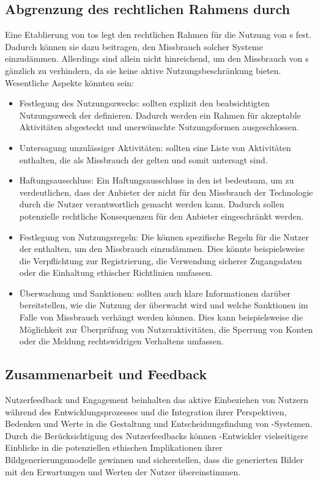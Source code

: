 \documentclass[hidelinks,12pt]{report}
\begin{document}
\subsection{Abgrenzung des rechtlichen Rahmens durch {}}
Eine Etablierung von \Gls{tos} legt den rechtlichen Rahmen für die Nutzung von s fest. Dadurch können sie dazu beitragen, den Missbrauch solcher Systeme einzudämmen. 
Allerdings sind  allein nicht hinreichend, um den Missbrauch von s gänzlich zu verhindern, da sie keine aktive Nutzungsbeschränkung bieten. Wesentliche Aspekte könnten sein:\\

\begin{itemize}
    \item Festlegung des Nutzungszwecks:  sollten explizit den beabsichtigten Nutzungszweck der  definieren. Dadurch werden ein Rahmen für akzeptable Aktivitäten abgesteckt und unerwünschte Nutzungsformen ausgeschlossen.
    \item Untersagung unzulässiger Aktivitäten:  sollten eine Liste von Aktivitäten enthalten, die als Missbrauch der  gelten und somit untersagt sind.
    \item Haftungsausschluss: Ein Haftungsausschluss in den  ist bedeutsam, um zu verdeutlichen, dass der Anbieter der  nicht für den Missbrauch der Technologie durch die Nutzer verantwortlich gemacht werden kann. Dadurch sollen potenzielle rechtliche Konsequenzen für den Anbieter eingeschränkt werden.
    \item Festlegung von Nutzungsregeln: Die   können spezifische Regeln für die Nutzer der  enthalten, um den Missbrauch einzudämmen. Dies könnte beispielsweise die Verpflichtung zur Registrierung, die Verwendung sicherer Zugangsdaten oder die Einhaltung ethischer Richtlinien umfassen.
    \item Überwachung und Sanktionen:  sollten auch klare Informationen darüber bereitstellen, wie die Nutzung der  überwacht wird und welche Sanktionen im Falle von Missbrauch verhängt werden können. Dies kann beispielsweise die Möglichkeit zur Überprüfung von Nutzeraktivitäten, die Sperrung von Konten oder die Meldung rechtswidrigen Verhaltens umfassen.
\end{itemize}

\subsection{Zusammenarbeit und Feedback}
Nutzerfeedback und Engagement beinhalten das aktive Einbeziehen von Nutzern während des Entwicklungsprozesses und die Integration ihrer Perspektiven, Bedenken und Werte in die Gestaltung und Entscheidungsfindung von -Systemen. Durch die Berücksichtigung des Nutzerfeedbacks können -Entwickler vielseitigere Einblicke in die potenziellen ethischen Implikationen ihrer Bildgenerierungsmodelle gewinnen und sicherstellen, dass die generierten Bilder mit den Erwartungen und Werten der Nutzer übereinstimmen.
\end{document}
